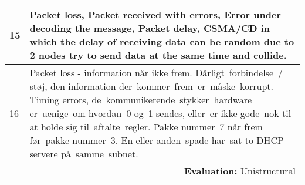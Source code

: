 \begin{longtable}{|p{0.3cm}|p{14.7cm}|}
15 & Packet loss, Packet received with errors, Error under decoding the message, Packet delay, CSMA/CD in which the delay of receiving data can be random due to 2 nodes try to send data at the same time and collide. \\ \hline 

16 & Packet loss - information når ikke frem. Dårligt forbindelse / støj, den information der kommer frem er måske korrupt. Timing errors, de kommunikerende stykker hardware er uenige om hvordan 0 og 1 sendes, eller er ikke gode nok til at holde sig til aftalte regler. Pakke nummer 7 når frem før pakke nummer 3. En eller anden spade har sat to DHCP servere på samme subnet. \\ \hline 

\multicolumn{2}{r}{\textbf{Evaluation:} Unistructural} \\ 

\end{longtable}
\normalsize



